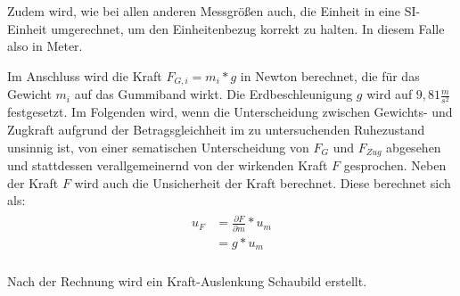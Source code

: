 \documentclass[
  9pt,
]{article}
\newenvironment{Shaded}{\begin{snugshade}}{\end{snugshade}}
\newcommand{\CommentTok}[1]{\textcolor[rgb]{0.56,0.35,0.01}{\textit{#1}}}
\newcommand{\DecValTok}[1]{\textcolor[rgb]{0.00,0.00,0.81}{#1}}
\newcommand{\FloatTok}[1]{\textcolor[rgb]{0.00,0.00,0.81}{#1}}
\newcommand{\NormalTok}[1]{#1}
\newcommand{\OtherTok}[1]{\textcolor[rgb]{0.56,0.35,0.01}{#1}}
\newcommand{\SpecialCharTok}[1]{\textcolor[rgb]{0.00,0.00,0.00}{#1}}
\begin{document}
Zudem wird, wie bei allen anderen Messgrößen auch, die Einheit in eine
SI-Einheit umgerechnet, um den Einheitenbezug korrekt zu halten. In
diesem Falle also in Meter.

Im Anschluss wird die Kraft \(F_{G,i} = m_i * g\) in Newton berechnet,
die für das Gewicht \(m_i\) auf das Gummiband wirkt. Die
Erdbeschleunigung \(g\) wird auf \(9,81\frac{m}{s^2}\) festgesetzt. Im
Folgenden wird, wenn die Unterscheidung zwischen Gewichts- und Zugkraft
aufgrund der Betragsgleichheit im zu untersuchenden Ruhezustand unsinnig
ist, von einer sematischen Unterscheidung von \(F_G\) und \(F_{Zug}\)
abgesehen und stattdessen verallgemeinernd von der wirkenden Kraft \(F\)
gesprochen. Neben der Kraft \(F\) wird auch die Unsicherheit der Kraft
berechnet. Diese berechnet sich als: \begin{align*}
\begin{split}
u_F &= \frac{\partial F}{\partial {m}}*u_m\\
    &= g*u_m\\
\end{split}
\end{align*}

Nach der Rechnung wird ein Kraft-Auslenkung Schaubild erstellt.

\begin{Shaded}
\end{Shaded}
\end{document}
